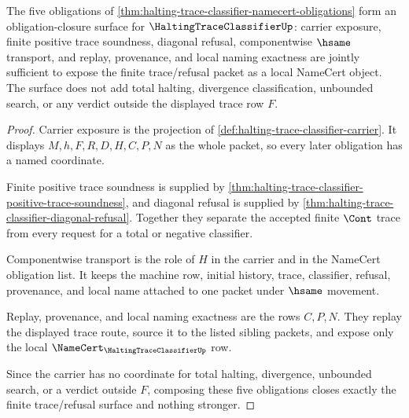 \begin{theorem}
\label{thm:halting-trace-classifier-obligation-closure}
The five obligations of \autoref{thm:halting-trace-classifier-namecert-obligations} form an obligation-closure surface for $\HaltingTraceClassifierUp$: carrier exposure, finite positive trace soundness, diagonal refusal, componentwise $\hsame$ transport, and replay, provenance, and local naming exactness are jointly sufficient to expose the finite trace/refusal packet as a local NameCert object. The surface does not add total halting, divergence classification, unbounded search, or any verdict outside the displayed trace row $F$.
\end{theorem}
\begin{proof}
Carrier exposure is the projection of \autoref{def:halting-trace-classifier-carrier}. It displays $M,h,F,R,D,H,C,P,N$ as the whole packet, so every later obligation has a named coordinate.

Finite positive trace soundness is supplied by \autoref{thm:halting-trace-classifier-positive-trace-soundness}, and diagonal refusal is supplied by \autoref{thm:halting-trace-classifier-diagonal-refusal}. Together they separate the accepted finite $\Cont$ trace from every request for a total or negative classifier.

Componentwise transport is the role of $H$ in the carrier and in the NameCert obligation list. It keeps the machine row, initial history, trace, classifier, refusal, provenance, and local name attached to one packet under $\hsame$ movement.

Replay, provenance, and local naming exactness are the rows $C,P,N$. They replay the displayed trace route, source it to the listed sibling packets, and expose only the local $\NameCert_{\HaltingTraceClassifierUp}$ row.

Since the carrier has no coordinate for total halting, divergence, unbounded search, or a verdict outside $F$, composing these five obligations closes exactly the finite trace/refusal surface and nothing stronger.
\end{proof}



